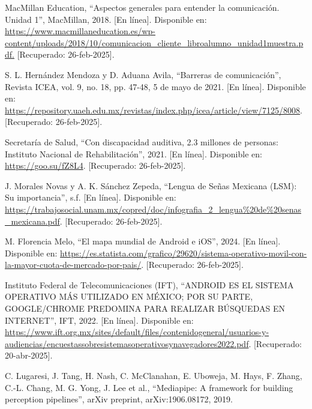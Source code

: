 \cleardoublepage
{}
\renewcommand{\bibname}{Bibliografía} %

\begingroup
\let\clearpage\relax %

\begin{thebibliography}{200}
    MacMillan Education, “Aspectos generales para entender la comunicación. Unidad 1”, MacMillan, 2018. [En línea]. Disponible en: \url{https://www.macmillaneducation.es/wp-content/uploads/2018/10/comunicacion_cliente_libroalumno_unidad1muestra.pdf.} [Recuperado: 26-feb-2025].

    S. L. Hernández Mendoza y D. Aduana Avila, “Barreras de comunicación”, Revista ICEA, vol. 9, no. 18, pp. 47-48, 5 de mayo de 2021. [En línea]. Disponible en: \url{https://repository.uaeh.edu.mx/revistas/index.php/icea/article/view/7125/8008}. [Recuperado: 26-feb-2025].

    Secretaría de Salud, “Con discapacidad auditiva, 2.3 millones de personas: Instituto Nacional de Rehabilitación”, 2021. [En línea]. Disponible en: \url{https://goo.su/fZ8L4}. [Recuperado: 26-feb-2025].

    J. Morales Novas y A. K. Sánchez Zepeda, “Lengua de Señas Mexicana (LSM): Su importancia”, s.f. [En línea]. Disponible en: \url{https://trabajosocial.unam.mx/copred/doc/infografia_2_lengua%20de%20senas_mexicana.pdf}. [Recuperado: 26-feb-2025].

    M. Florencia Melo, “El mapa mundial de Android e iOS”, 2024. [En línea]. Disponible en: \url{https://es.statista.com/grafico/29620/sistema-operativo-movil-con-la-mayor-cuota-de-mercado-por-pais/}. [Recuperado: 26-feb-2025].

    Instituto Federal de Telecomunicaciones (IFT), “ANDROID ES EL SISTEMA OPERATIVO MÁS UTILIZADO EN MÉXICO; POR SU PARTE, GOOGLE/CHROME PREDOMINA PARA REALIZAR BÚSQUEDAS EN INTERNET”, IFT, 2022. [En línea]. Disponible en: \url{https://www.ift.org.mx/sites/default/files/contenidogeneral/usuarios-y-audiencias/encuestassobresistemasoperativosynavegadores2022.pdf}. [Recuperado: 20-abr-2025].

    C. Lugaresi, J. Tang, H. Nash, C. McClanahan, E. Uboweja, M. Hays, F. Zhang, C.-L. Chang, M. G. Yong, J. Lee et al., “Mediapipe: A framework for building perception pipelines”, arXiv preprint, arXiv:1906.08172, 2019.


\end{thebibliography}
